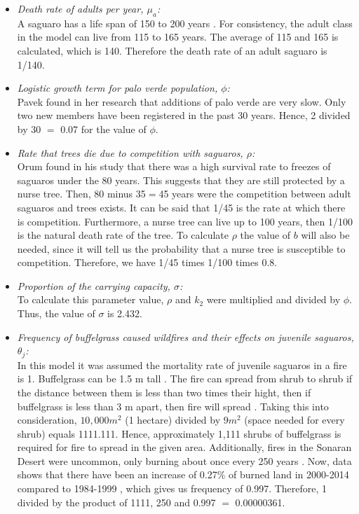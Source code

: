 \documentclass[a4paper]{article}
\begin{document}
\begin{itemize}
\item \textit{Death rate of adults per year, $\mu_a$:}\\
A saguaro has a life span of 150 to 200 years \cite{SaguaroGrowth}. For consistency, the adult class in the model can live from 115 to 165 years. The average of 115 and 165 is calculated, which is 140. Therefore the death rate of an adult saguaro is 1/140.
\item \textit{Logistic growth term for palo verde population, $\phi$:}\\
Pavek \cite{paloVerdeFacts} found in her research that additions of palo verde are very slow. Only two new members have been registered in the past 30 years. Hence, 2 divided by 30 $=$ 0.07 for the value of $\phi$.
\item \textit{Rate that trees die due to competition with saguaros, $\rho$:}\\
Orum \cite{Orum} found in his study that there was a high survival rate to freezes of saguaros under the 80 years. This suggests that they are still protected by a nurse tree. Then, 80 minus 35$=$45 years were the competition between adult saguaros and trees exists. It can be said that 1/45 is the rate at which there is competition. Furthermore, a nurse tree can live up to 100 years, then 1/100 \cite{PaloVFact} is the natural death rate of the tree. To calculate $\rho$ the value of $b$ will also be needed, since it will tell us the probability that a nurse tree is susceptible to competition. Therefore, we have 1/45 times 1/100 times 0.8.
\item \textit{Proportion of the carrying capacity, $\sigma$:}\\
To calculate this parameter value, $\rho$ and $k_2$ were multiplied and divided by $\phi$. Thus, the value of $\sigma$ is 2.432.
\item \textit{Frequency of buffelgrass caused wildfires and their effects on juvenile saguaros, $\theta_j$:}\\
In this model it was assumed the mortality rate of juvenile saguaros in a fire is 1. Buffelgrass can be 1.5 m tall \cite{kaufman2007invasive}. The fire can spread from shrub to shrub if the distance between them is less than two times their hight, then if buffelgrass is less than 3 m apart, then fire will spread \cite{FirePdistance}. Taking this into consideration, $10,000 m^2$ (1 hectare) divided by $9 m^2$ (space needed for every shrub) equals 1111.111. Hence, approximately 1,111 shrubs of buffelgrass is required for fire to spread in the given area. Additionally, fires in the Sonaran Desert were uncommon, only burning about once every 250 years \cite{BuffelManag}. Now, data shows that there have been an increase of 0.27\% of burned land in 2000-2014 compared to 1984-1999 \cite{Wildfire}, which gives us frequency of 0.997. Therefore, 1 divided by the product of 1111, 250 and 0.997 $=$ 0.00000361.


\end{itemize}
\end{document}

